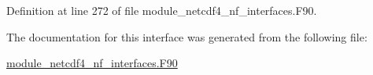 Definition at line 272 of file module\+\_\+netcdf4\+\_\+nf\+\_\+interfaces.\+F90.



The documentation for this interface was generated from the following file\+:\begin{DoxyCompactItemize}
\item 
\hyperlink{module__netcdf4__nf__interfaces_8F90}{module\+\_\+netcdf4\+\_\+nf\+\_\+interfaces.\+F90}\end{DoxyCompactItemize}
